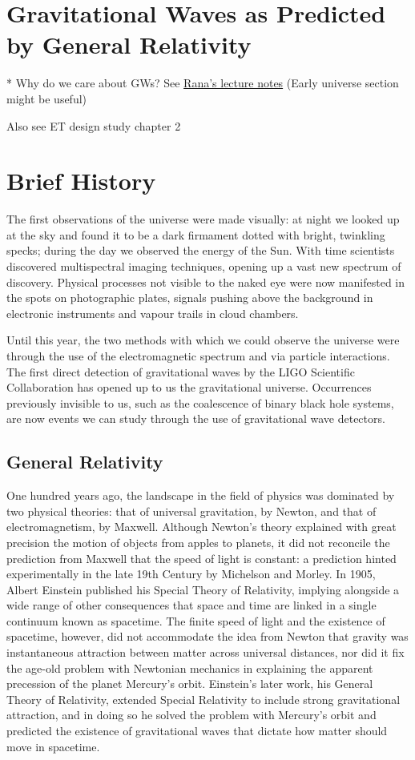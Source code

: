 \section{Gravitational Waves as Predicted by General Relativity}
* Why do we care about GWs? See \href{https://github.com/rxa254/StatisticalPhysics/blob/master/LectureNotes/ph2c_2015.pdf}{Rana's lecture notes}  (Early universe section might be useful)

Also see ET design study chapter 2

\section{Brief History}
The first observations of the universe were made visually: at night we looked up at the sky and found it to be a dark firmament dotted with bright, twinkling specks; during the day we observed the energy of the Sun. With time scientists discovered multispectral imaging techniques, opening up a vast new spectrum of discovery. Physical processes not visible to the naked eye were now manifested in the spots on photographic plates, signals pushing above the background in electronic instruments and vapour trails in cloud chambers.

Until this year, the two methods with which we could observe the universe were through the use of the electromagnetic spectrum and via particle interactions. The first direct detection of gravitational waves by the LIGO Scientific Collaboration has opened up to us the gravitational universe. Occurrences previously invisible to us, such as the coalescence of binary black hole systems, are now events we can study through the use of gravitational wave detectors.

\subsection{General Relativity}
One hundred years ago, the landscape in the field of physics was dominated by two physical theories: that of universal gravitation, by Newton, and that of electromagnetism, by Maxwell. Although Newton's theory explained with great precision the motion of objects from apples to planets, it did not reconcile the prediction from Maxwell that the speed of light is constant: a prediction hinted experimentally in the late 19th Century by Michelson and Morley. In 1905, Albert Einstein published his Special Theory of Relativity, implying alongside a wide range of other consequences that space and time are linked in a single continuum known as spacetime. The finite speed of light and the existence of spacetime, however, did not accommodate the idea from Newton that gravity was instantaneous attraction between matter across universal distances, nor did it fix the age-old problem with Newtonian mechanics in explaining the apparent precession of the planet Mercury's orbit. Einstein's later work, his General Theory of Relativity, extended Special Relativity to include strong gravitational attraction, and in doing so he solved the problem with Mercury's orbit and predicted the existence of gravitational waves that dictate how matter should move in spacetime.

